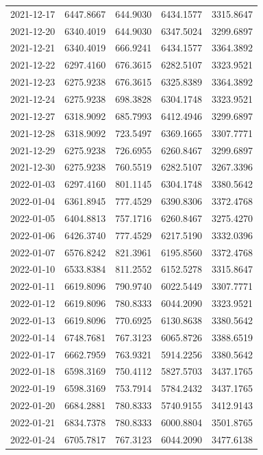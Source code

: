 {\begin{longtable}{lllll}
2021-12-17 & 6447.8667 & 644.9030 & 6434.1577 & 3315.8647 \\
2021-12-20 & 6340.4019 & 644.9030 & 6347.5024 & 3299.6897 \\
2021-12-21 & 6340.4019 & 666.9241 & 6434.1577 & 3364.3892 \\
2021-12-22 & 6297.4160 & 676.3615 & 6282.5107 & 3323.9521 \\
2021-12-23 & 6275.9238 & 676.3615 & 6325.8389 & 3364.3892 \\
2021-12-24 & 6275.9238 & 698.3828 & 6304.1748 & 3323.9521 \\
2021-12-27 & 6318.9092 & 685.7993 & 6412.4946 & 3299.6897 \\
2021-12-28 & 6318.9092 & 723.5497 & 6369.1665 & 3307.7771 \\
2021-12-29 & 6275.9238 & 726.6955 & 6260.8467 & 3299.6897 \\
2021-12-30 & 6275.9238 & 760.5519 & 6282.5107 & 3267.3396 \\
2022-01-03 & 6297.4160 & 801.1145 & 6304.1748 & 3380.5642 \\
2022-01-04 & 6361.8945 & 777.4529 & 6390.8306 & 3372.4768 \\
2022-01-05 & 6404.8813 & 757.1716 & 6260.8467 & 3275.4270 \\
2022-01-06 & 6426.3740 & 777.4529 & 6217.5190 & 3332.0396 \\
2022-01-07 & 6576.8242 & 821.3961 & 6195.8560 & 3372.4768 \\
2022-01-10 & 6533.8384 & 811.2552 & 6152.5278 & 3315.8647 \\
2022-01-11 & 6619.8096 & 790.9740 & 6022.5449 & 3307.7771 \\
2022-01-12 & 6619.8096 & 780.8333 & 6044.2090 & 3323.9521 \\
2022-01-13 & 6619.8096 & 770.6925 & 6130.8638 & 3380.5642 \\
2022-01-14 & 6748.7681 & 767.3123 & 6065.8726 & 3388.6519 \\
2022-01-17 & 6662.7959 & 763.9321 & 5914.2256 & 3380.5642 \\
2022-01-18 & 6598.3169 & 750.4112 & 5827.5703 & 3437.1765 \\
2022-01-19 & 6598.3169 & 753.7914 & 5784.2432 & 3437.1765 \\
2022-01-20 & 6684.2881 & 780.8333 & 5740.9155 & 3412.9143 \\
2022-01-21 & 6834.7378 & 780.8333 & 6000.8804 & 3501.8765 \\
2022-01-24 & 6705.7817 & 767.3123 & 6044.2090 & 3477.6138 \\

\end{longtable}}
